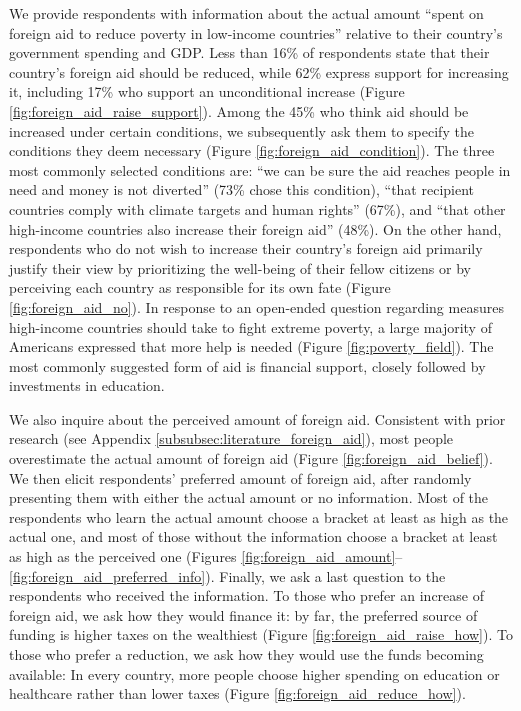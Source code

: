 We provide respondents with information about the actual amount ``spent on foreign aid to reduce poverty in low-income countries'' relative to their country's government spending and GDP. Less than 16\% of respondents state that their country's foreign aid should be reduced, while 62\% express support for increasing it, including 17\% who support an unconditional increase (Figure \ref{fig:foreign_aid_raise_support}). Among the 45\% who think aid should be increased under certain conditions, we subsequently ask them to specify the conditions they deem necessary (Figure \ref{fig:foreign_aid_condition}). The three most commonly selected conditions are: ``we can be sure the aid reaches people in need and money is not diverted'' (73\% chose this condition), ``that recipient countries comply with climate targets and human rights'' (67\%), and ``that other high-income countries also increase their foreign aid'' (48\%). %
On the other hand, respondents who do not wish to increase their country's foreign aid primarily justify their view by prioritizing the well-being of their fellow citizens or by perceiving each country as responsible for its own fate (Figure \ref{fig:foreign_aid_no}). In response to an open-ended question regarding measures high-income countries should take to fight extreme poverty, a large majority of Americans expressed that more help is needed (Figure \ref{fig:poverty_field}). The most commonly suggested form of aid is financial support, closely followed by investments in education. 


We also inquire about the perceived amount of foreign aid. Consistent with prior research (see Appendix \ref{subsubsec:literature_foreign_aid}), most people overestimate the actual amount of foreign aid (Figure \ref{fig:foreign_aid_belief}). We then elicit respondents' preferred amount of foreign aid, after randomly presenting them with either the actual amount or no information. Most of the respondents who learn the actual amount choose a bracket at least as high as the actual one, and most of those without the information choose a bracket at least as high as the perceived one (Figures \ref{fig:foreign_aid_amount}--\ref{fig:foreign_aid_preferred_info}). Finally, we ask a last question to the respondents who received the information. To those who prefer an increase of foreign aid, we ask how they would finance it: by far, the preferred source of funding is higher taxes on the wealthiest (Figure \ref{fig:foreign_aid_raise_how}). To those who prefer a reduction, we ask how they would use the funds becoming available: %
In every country, more people choose higher spending on education or healthcare rather than lower taxes (Figure \ref{fig:foreign_aid_reduce_how}). 


